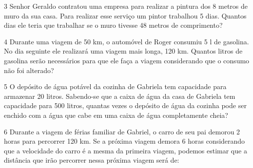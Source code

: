 
\num{3} Senhor Geraldo contratou uma empresa para realizar a pintura dos 8
metros de muro da sua casa. Para realizar esse serviço um pintor
trabalhou 5 dias. Quantos dias ele teria que trabalhar se o muro tivesse
48 metros de comprimento?



\num{4} Durante uma viagem de 50 km, o automóvel de Roger consumiu 5 l de
gasolina. No dia seguinte ele realizará uma viagem mais longa, 120 km.
Quantos litros de gasolina serão necessários para que ele faça a viagem
considerando que o consumo não foi alterado?



\num{5} O depósito de água potável da cozinha de Gabriela tem capacidade
para armazenar 20 litros. Sabendo-se que a caixa de água da casa de
Gabriela tem capacidade para 500 litros, quantas vezes o depósito de
água da cozinha pode ser enchido com a água que cabe em uma caixa de
água completamente cheia?



\num{6} Durante a viagem de férias familiar de Gabriel, o carro de seu pai
demorou 2 horas para percorrer 120 km. Se a próxima viagem demora 6
horas considerando que a velocidade do carro é a mesma da primeira
viagem, podemos estimar que a distância que irão percorrer nessa próxima
viagem será de:


